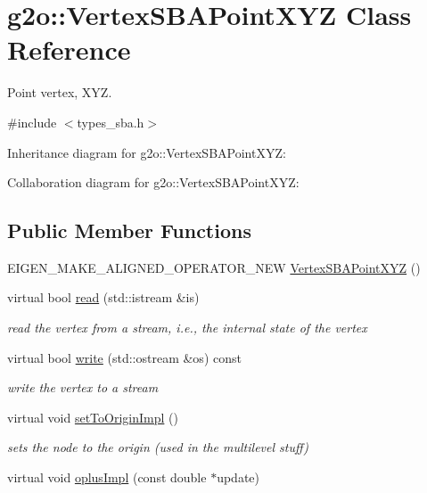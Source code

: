 \hypertarget{classg2o_1_1VertexSBAPointXYZ}{}\section{g2o\+:\+:Vertex\+S\+B\+A\+Point\+X\+YZ Class Reference}
\label{classg2o_1_1VertexSBAPointXYZ}


Point vertex, X\+YZ.  




{\ttfamily \#include $<$types\+\_\+sba.\+h$>$}



Inheritance diagram for g2o\+:\+:Vertex\+S\+B\+A\+Point\+X\+YZ\+:


Collaboration diagram for g2o\+:\+:Vertex\+S\+B\+A\+Point\+X\+YZ\+:
\subsection*{Public Member Functions}
\begin{DoxyCompactItemize}
\item 
E\+I\+G\+E\+N\+\_\+\+M\+A\+K\+E\+\_\+\+A\+L\+I\+G\+N\+E\+D\+\_\+\+O\+P\+E\+R\+A\+T\+O\+R\+\_\+\+N\+EW \hyperlink{classg2o_1_1VertexSBAPointXYZ_ad2b835ac63c1bbe22975a409151036d8}{Vertex\+S\+B\+A\+Point\+X\+YZ} ()
\item 
virtual bool \hyperlink{classg2o_1_1VertexSBAPointXYZ_a3668aa23ed3fc7e2c3e6bddda7ddcd1a}{read} (std\+::istream \&is)
\begin{DoxyCompactList}\small\item\em read the vertex from a stream, i.\+e., the internal state of the vertex \end{DoxyCompactList}\item 
virtual bool \hyperlink{classg2o_1_1VertexSBAPointXYZ_aa600a1190e1760b5616de4f4e26ca5f8}{write} (std\+::ostream \&os) const 
\begin{DoxyCompactList}\small\item\em write the vertex to a stream \end{DoxyCompactList}\item 
virtual void \hyperlink{classg2o_1_1VertexSBAPointXYZ_a787b72465f35a3f30fcbb6b8056b47c4}{set\+To\+Origin\+Impl} ()
\begin{DoxyCompactList}\small\item\em sets the node to the origin (used in the multilevel stuff) \end{DoxyCompactList}\item 
virtual void \hyperlink{classg2o_1_1VertexSBAPointXYZ_aa2a13838edc46ed5395fee5c07c4c8ea}{oplus\+Impl} (const double $\ast$update)
\end{DoxyCompactItemize}
